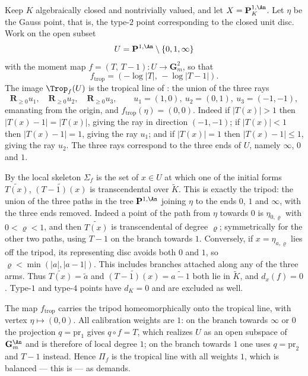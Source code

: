 \begin{example}
\label{ex:ch13-type-two}
Keep $K$ algebraically closed and nontrivially valued, and let
$X=\mathbf P^{1,\An}_K$.  Let $\eta$ be the Gauss point, that is, the
type-$2$ point corresponding to the closed unit disc.  Work on the open
subset
\[
 U=\mathbf P^{1,\An}\setminus\{0,1,\infty\}
\]
with the moment map $f=(T,\,T-1):U\to\mathbf G_m^2$, so that
\[
 f_{\mathrm{trop}}=(-\log|T|,\,-\log|T-1|).
\]
The image $\Trop_f(U)$ is the tropical line of
: the union of the three rays
\[
 \mathbf R_{\ge0}u_1,\quad \mathbf R_{\ge0}u_2,\quad \mathbf R_{\ge0}u_3,
 \qquad
 u_1=(1,0),\ u_2=(0,1),\ u_3=(-1,-1),
\]
emanating from the origin, and $f_{\mathrm{trop}}(\eta)=(0,0)$.  Indeed if
$|T(x)|>1$ then $|T(x)-1|=|T(x)|$, giving the ray in direction
$(-1,-1)$; if $|T(x)|<1$ then $|T(x)-1|=1$, giving the ray $u_1$; and if
$|T(x)|=1$ then $|T(x)-1|\le1$, giving the ray $u_2$.  The three rays
correspond to the three ends of $U$, namely $\infty$, $0$ and $1$.

By  the local skeleton $\Sigma_f$ is the
set of $x\in U$ at which one of the initial forms $\widetilde{T(x)}$,
$\widetilde{(T-1)(x)}$ is transcendental over $\widetilde K$.  This is
exactly the tripod: the union of the three paths in the tree
$\mathbf P^{1,\An}$ joining $\eta$ to the ends $0$, $1$ and $\infty$, with
the three ends removed.  Indeed a point of the path from $\eta$ towards $0$
is $\eta_{0,\varrho}$ with $0<\varrho<1$, and then $\widetilde{T(x)}$ is
transcendental of degree $\varrho$; symmetrically for the other two paths,
using $T-1$ on the branch towards $1$.  Conversely, if $x=\eta_{a,\varrho}$
lies off the tripod, its representing disc avoids both $0$ and $1$,
so $\varrho<\min(|a|,|a-1|)$.  This includes branches attached along any
of the three arms.  Thus
$\widetilde{T(x)}=\widetilde a$ and
$\widetilde{(T-1)(x)}=\widetilde{a-1}$ both lie in $\widetilde K$, and
$d_x(f)=0$.  Type-$1$ and type-$4$ points have $d_K=0$ and are excluded as
well.

The map $f_{\mathrm{trop}}$ carries the tripod homeomorphically onto the
tropical line, with vertex $\eta\mapsto(0,0)$.  All calibration weights are
$1$: on the branch towards $\infty$ or $0$ the projection $q=\mathrm{pr}_1$
gives $q\circ f=T$, which realizes $U$ as an open subspace of
$\mathbf G_m^{\An}$ and is therefore of local degree $1$; on the branch
towards $1$ one uses $q=\mathrm{pr}_2$ and $T-1$ instead.  Hence
$\Pi_f$ is the tropical line with all weights $1$, which is balanced ---
this is  --- as
 demands.


\end{example}
